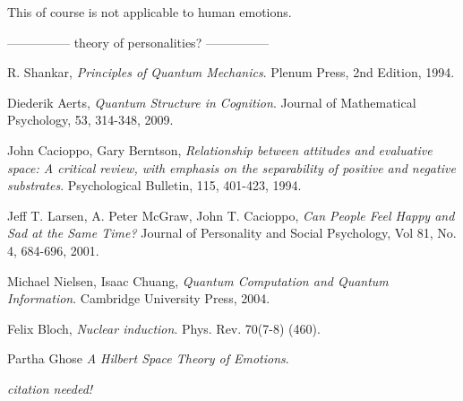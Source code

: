 \documentclass[%
 aip,
 jmp,%
 amsmath,amssymb,
 reprint,%
]{revtex4-1}
\begin{document}
This of course is not applicable to human emotions.











---------------
 theory of personalities?
---------------




\begin{thebibliography}{9}

  R. Shankar,
  \emph{Principles of Quantum Mechanics}.
  Plenum Press, 
  2nd Edition,
  1994.



Diederik Aerts,
\emph{Quantum Structure in Cognition}.
Journal of Mathematical Psychology, 53, 314-348, 2009.

John Cacioppo, Gary Berntson, 
\emph{Relationship between attitudes and evaluative space: A critical review, with emphasis on the separability of positive and negative substrates}.
Psychological Bulletin, 115, 401-423, 1994.

Jeff T. Larsen, A. Peter McGraw, John T. Cacioppo,
\emph{Can People Feel Happy and Sad at the Same Time?}
Journal of Personality and Social Psychology, Vol 81, No. 4, 684-696, 2001.


 Michael Nielsen, Isaac Chuang,
 \emph{Quantum Computation and Quantum Information}.
 Cambridge University Press,
 2004.

Felix Bloch,
\emph{Nuclear induction}.
Phys. Rev. 70(7-8) (460).

Partha Ghose
\emph{A Hilbert Space Theory of Emotions}.




\emph{citation needed!}


\end{thebibliography}
\end{document}
